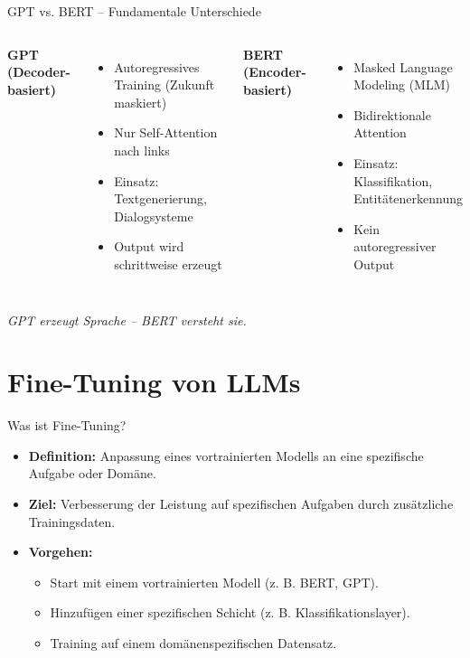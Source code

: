 \documentclass[aspectratio=1610, xcolor=dvipsnames, 9pt]{beamer}
\begin{document}
\begin{frame}{GPT vs. BERT – Fundamentale Unterschiede}
  \begin{columns}
      \textbf{GPT (Decoder-basiert)}
      \begin{itemize}
          \item Autoregressives Training (Zukunft maskiert)
          \item Nur Self-Attention nach links
          \item Einsatz: Textgenerierung, Dialogsysteme
          \item Output wird schrittweise erzeugt
      \end{itemize}
      
      \textbf{BERT (Encoder-basiert)}
      \begin{itemize}
          \item Masked Language Modeling (MLM)
          \item Bidirektionale Attention
          \item Einsatz: Klassifikation, Entitätenerkennung
          \item Kein autoregressiver Output
      \end{itemize}
  \end{columns}
  \vspace{0.4cm}
  \begin{center}
      \textit{GPT erzeugt Sprache -- BERT versteht sie.}
  \end{center}
\end{frame}

\section{Fine-Tuning von LLMs}

\begin{frame}{Was ist Fine-Tuning?}
  \begin{itemize}
    \item \textbf{Definition:} Anpassung eines vortrainierten Modells an eine spezifische Aufgabe oder Domäne.
    \item \textbf{Ziel:} Verbesserung der Leistung auf spezifischen Aufgaben durch zusätzliche Trainingsdaten.
    \item \textbf{Vorgehen:}
      \begin{itemize}
        \item Start mit einem vortrainierten Modell (z. B. BERT, GPT).
        \item Hinzufügen einer spezifischen Schicht (z. B. Klassifikationslayer).
        \item Training auf einem domänenspezifischen Datensatz.
      \end{itemize}
  \end{itemize}
\end{frame}
\end{document}
